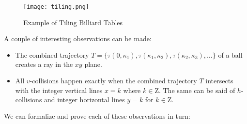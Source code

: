 \begin{figure}
  \texttt{[image: tiling.png]}
  \caption{\label{fig:tiling}Example of Tiling Billiard Tables}
\end{figure}

A couple of interesting observations can be made:

\begin{itemize}
  \item The combined trajectory $T = \{\tau(0, \kappa_1), \tau(\kappa_1, \kappa_2), \tau(\kappa_2, \kappa_3), \ldots \}$ of a ball creates a ray in the $xy$ plane.
  \item All $v$-collisions happen exactly when the combined trajectory $T$ intersects with the integer vertical lines $x = k$ where $k \in \mathrm{Z}$. The same can be said of $h$-collisions and integer horizontal lines $y = k$ for $k \in \mathrm{Z}$.
\end{itemize}

We can formalize and prove each of these observations in turn:

